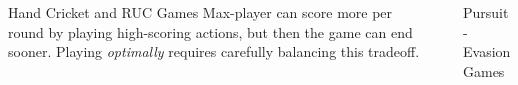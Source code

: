 \documentclass[final,20pt]{beamer}
\newlength{\sepwidth}
\newlength{\colwidth}
\newcommand{\separatorcolumn}{\begin{column}{\sepwidth}\end{column}}
\begin{document}
\begin{frame}[t]
\begin{columns}[t]
\begin{column}{\colwidth}
\begin{block}{Hand Cricket and RUC Games}
Max-player can score more per round by playing high-scoring actions, but then the game can end sooner.
Playing \emph{optimally} requires carefully balancing this tradeoff.


\end{block}

\end{column}

\separatorcolumn

\begin{column}{\colwidth}

\begin{block}{Pursuit-Evasion Games}


\end{block}
\end{column}
\end{columns}
\end{frame}
\end{document}
